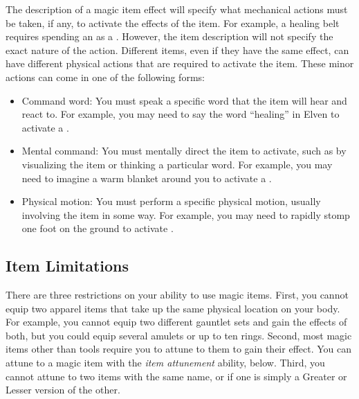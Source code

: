         The description of a magic item effect will specify what mechanical actions must be taken, if any, to activate the effects of the item.
        For example, a healing belt requires spending an  as a .
        However, the item description will not specify the exact nature of the action.
        Different items, even if they have the same effect, can have different physical actions that are required to activate the item.
        These minor actions can come in one of the following forms:
        \begin{itemize}
           \item Command word: You must speak a specific word that the item will hear and react to.
                For example, you may need to say the word ``healing'' in Elven to activate a .
            \item Mental command: You must mentally direct the item to activate, such as by visualizing the item or thinking a particular word.
                For example, you may need to imagine a warm blanket around you to activate a .
            \item Physical motion: You must perform a specific physical motion, usually involving the item in some way.
                For example, you may need to rapidly stomp one foot on the ground to activate .
        \end{itemize}


    \subsection{Item Limitations}

        There are three restrictions on your ability to use magic items.
        First, you cannot equip two apparel items that take up the same physical location on your body.
        For example, you cannot equip two different gauntlet sets and gain the effects of both, but you could equip several amulets or up to ten rings.
        Second, most magic items other than tools require you to attune to them to gain their effect.
        You can attune to a magic item with the \textit{item attunement} ability, below.
        Third, you cannot attune to two items with the same name, or if one is simply a Greater or Lesser version of the other.

